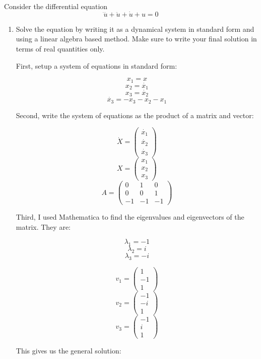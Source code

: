 \documentclass[11pt,answers]{exam}
\begin{document}
\begin{questions}
\item Consider the differential equation
\[
\dddot{u} + \ddot{u} + \dot{u} + u = 0
\]
\begin{enumerate}
\item Solve the equation by writing it as a dynamical system in standard form and using a linear algebra based method. Make sure to write your final solution in terms of real quantities only.

\begin{solution}
First, setup a system of equations in standard form:

$$x_1 = x$$
$$x_2 = \dot{x_1}$$
$$x_3 = \dot{x_2}$$
$$\dot{x_3} = -x_3 - x_2 - x_1$$

Second, write the system of equations as the product of a matrix and vector:

$$\dot{X} = \left(\begin{array}{ccc} \dot{x_1} \\ \dot{x_2} \\ \dot{x_3} \end{array}\right)$$
$$X = \left(\begin{array}{ccc} {x_1} \\ {x_2} \\ {x_3} \end{array}\right)$$
$$A = \left(\begin{array}{ccc} 0 & 1 & 0 \\ 0 & 0 & 1 \\ -1 & -1 & -1 \end{array}\right)$$

Third, I used Mathematica to find the eigenvalues and eigenvectors of the matrix. They are:

$$\lambda_1 = -1 $$
$$\lambda_2 = i$$
$$\lambda_3 = -i$$

$$v_1 = \left(\begin{array}{ccc} 1 \\ -1 \\ 1 \end{array}\right) $$
$$v_2 = \left(\begin{array}{ccc} -1 \\ -i \\ 1 \end{array}\right)$$
$$v_3 = \left(\begin{array}{ccc} -1 \\ i \\ 1 \end{array}\right)$$

This gives us the general solution:


\end{solution}
\end{enumerate}
\end{questions}
\end{document}
